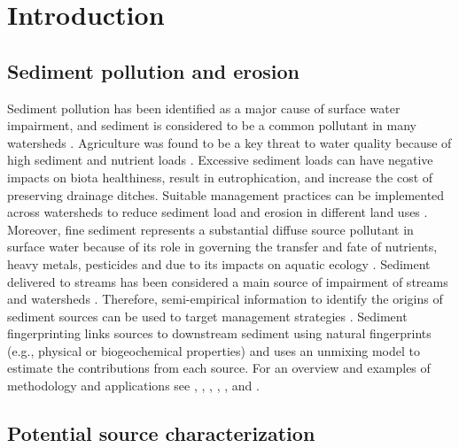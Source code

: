 \documentclass[
  number]{elsarticle}
\begin{document}
\section{Introduction}\label{introduction}

\subsection{Sediment pollution and
erosion}\label{sediment-pollution-and-erosion}

Sediment pollution has been identified as a major cause of surface water
impairment, and sediment is considered to be a common pollutant in many
watersheds \citep{owens2005}. Agriculture was found to be a key threat
to water quality because of high sediment and nutrient loads
\citep{vörösmarty2010}. Excessive sediment loads can have negative
impacts on biota healthiness, result in eutrophication, and increase the
cost of preserving drainage ditches. Suitable management practices can
be implemented across watersheds to reduce sediment load and erosion in
different land uses \citep{noe2020}. Moreover, fine sediment represents
a substantial diffuse source pollutant in surface water because of its
role in governing the transfer and fate of nutrients, heavy metals,
pesticides and due to its impacts on aquatic ecology
\citep{walling2008}. Sediment delivered to streams has been considered a
main source of impairment of streams and watersheds \citep{bilotta2008}.
Therefore, semi-empirical information to identify the origins of
sediment sources can be used to target management strategies
\citep{mukundan2012}. Sediment fingerprinting links sources to
downstream sediment using natural fingerprints (e.g., physical or
biogeochemical properties) and uses an unmixing model to estimate the
contributions from each source. For an overview and examples of
methodology and applications see \citep{collins1997},
\citep{walling2008}, \citep{davis2009}, \citep{owens2016},
\citep{collins2020}, and \citep{evrard2022}.

\subsection{Potential source
characterization}\label{potential-source-characterization}
\end{document}
